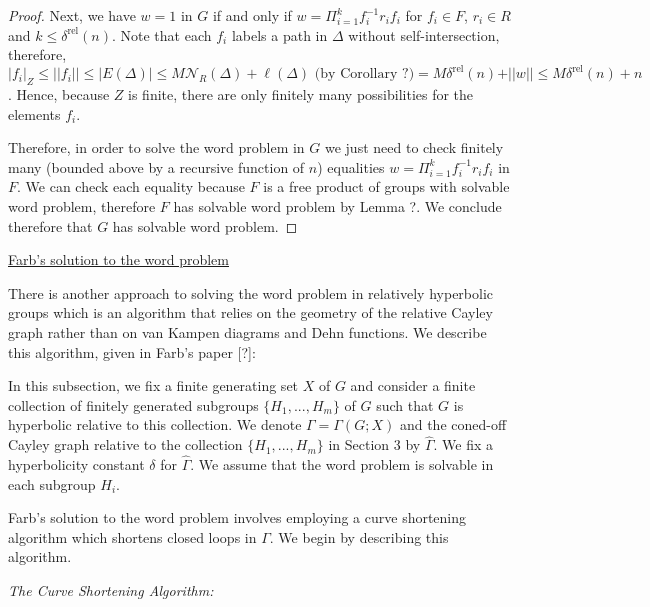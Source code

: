 \documentclass[12pt]{article}
\newcommand{\vs}{\vskip10pt}
\begin{document}
\begin{proof}
		Next, we have $w = 1$ in $G$ if and only if $w = \Pi_{i=1}^k f_i^{-1} r_i f_i$ for $f_i \in F$, $r_i \in R$ and $k \leq \delta^{\text{rel}}(n)$. Note that each $f_i$ labels a path in $\Delta$ without self-intersection, therefore, $ \vert f_i \vert_Z \leq \vert \vert f_i \vert \vert \leq \vert E(\Delta) \vert \leq M \mathcal{N}_R(\Delta) + \ell(\Delta) \text{ (by Corollary ?)} = M \delta^{\text{rel}}(n) + \vert \vert w \vert \vert \leq M \delta^{\text{rel}}(n) + n$. Hence, because $Z$ is finite, there are only finitely many possibilities for the elements $f_i$. 
		
		\vs 
		
		Therefore, in order to solve the word problem in $G$ we just need to check finitely many (bounded above by a recursive function of $n$) equalities $w = \Pi_{i=1}^k f_i^{-1} r_i f_i$ in $F$. We can check each equality because $F$ is a free product of groups with solvable word problem, therefore $F$ has solvable word problem by Lemma ?. We conclude therefore that $G$ has solvable word problem. 
		
	\end{proof}

	\underline{Farb's solution to the word problem}
	
	\vs

	There is another approach to solving the word problem in relatively hyperbolic groups which is an algorithm that relies on the geometry of the relative Cayley graph rather than on van Kampen diagrams and Dehn functions. We describe this algorithm, given in Farb's paper [?]: 
	
	\vs
	
	In this subsection, we fix a finite generating set $X$ of $G$ and consider a finite collection of finitely generated subgroups $\{H_1,...,H_m\}$ of $G$ such that $G$ is hyperbolic relative to this collection. We denote $\Gamma =  \Gamma(G;X)$ and the coned-off Cayley graph relative to the collection $\{H_1,...,H_m\}$ in Section 3 by $\hat{\Gamma}$. We fix a hyperbolicity constant $\delta$ for $\hat{\Gamma}$. We assume that the word problem is solvable in each subgroup $H_i$. 
	
	\vs
	
	Farb's solution to the word problem involves employing a curve shortening algorithm which shortens closed loops in $\Gamma$. We begin by describing this algorithm. 
	
	\vs 
	
	\textit{The Curve Shortening Algorithm: } 
	
\end{document}
